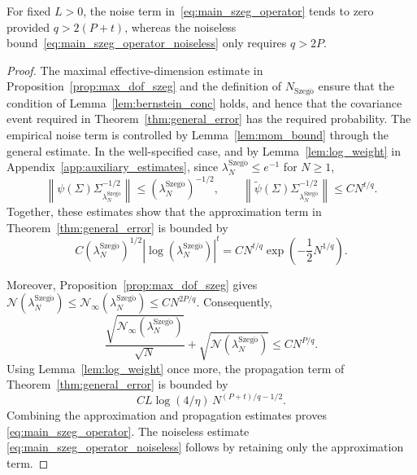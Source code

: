 \documentclass[11pt]{article}
\numberwithin{equation}{section}
\theoremstyle{plain}
\theoremstyle{definition}
\theoremstyle{remark}
\newcommand{\norm}[1]{\left\lVert#1\right\rVert}
\newcommand{\tpsi}{\widetilde{\psi}}
\newcommand{\abs}[1]{\left|#1\right|}
\begin{document}
For fixed $L>0$, the noise term in~\eqref{eq:main_szeg_operator} tends
to zero provided $q>2(P+t)$, whereas the noiseless
bound~\eqref{eq:main_szeg_operator_noiseless} only requires $q>2P$.

\begin{proof}
The maximal effective-dimension estimate in
Proposition~\ref{prop:max_dof_szeg} and the definition of
$N_{\mathrm{Szeg\ddot{o}}}$ ensure that the condition of
Lemma~\ref{lem:bernstein_conc} holds, and hence that the covariance event
required in Theorem~\ref{thm:general_error} has the required probability.
The empirical noise term is controlled by Lemma~\ref{lem:mom_bound}
through the general estimate. In the well-specified
case, and by Lemma~\ref{lem:log_weight} in Appendix~\ref{app:auxiliary_estimates}, since
$\lambda_N^{\mathrm{Szeg\ddot{o}}}\leq e^{-1}$ for $N\geq1$,
\[
\norm{\psi(\Sigma)\Sigma_{\lambda_N^{\mathrm{Szeg\ddot{o}}}}^{-1/2}}
\leq\left(\lambda_N^{\mathrm{Szeg\ddot{o}}}\right)^{-1/2},
\qquad
\norm{\tpsi(\Sigma)\Sigma_{\lambda_N^{\mathrm{Szeg\ddot{o}}}}^{-1/2}}\leq C N^{t/q}.
\]
Together, these estimates show that the approximation term
in Theorem~\ref{thm:general_error} is bounded by
\[
C\left(\lambda_N^{\mathrm{Szeg\ddot{o}}}\right)^{1/2}
\abs{\log\left(\lambda_N^{\mathrm{Szeg\ddot{o}}}\right)}^t
=
C N^{t/q}
\exp\left(-\frac{1}{2}N^{1/q}\right).
\]

Moreover, Proposition~\ref{prop:max_dof_szeg} gives
$\mathcal{N}(\lambda_N^{\mathrm{Szeg\ddot{o}}})\leq\mathcal{N}_{\infty}(\lambda_N^{\mathrm{Szeg\ddot{o}}})\leq CN^{2P/q}$.
Consequently,
\[
\frac{\sqrt{\mathcal{N}_{\infty}
\left(\lambda_N^{\mathrm{Szeg\ddot{o}}}\right)}}{\sqrt{N}}
+
\sqrt{\mathcal{N}
\left(\lambda_N^{\mathrm{Szeg\ddot{o}}}\right)}
\leq
CN^{P/q}.
\]
Using Lemma~\ref{lem:log_weight} once more, the propagation term of
Theorem~\ref{thm:general_error} is bounded by
\[
CL\log(4/\eta)\,N^{(P+t)/q-1/2}.
\]
Combining the approximation and propagation estimates proves
\eqref{eq:main_szeg_operator}. The noiseless estimate
\eqref{eq:main_szeg_operator_noiseless} follows by retaining only the
approximation term.
\end{proof}
\end{document}
